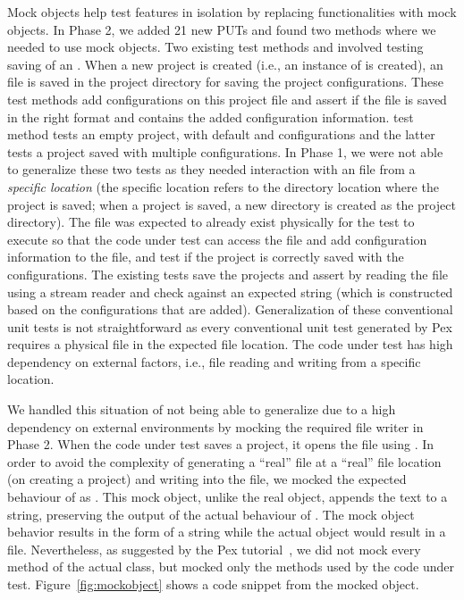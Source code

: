 Mock objects help test features in isolation by replacing functionalities with mock objects. In Phase 2, we added 21 new PUTs and found two methods where we needed to use mock objects. Two existing test methods  and  involved testing saving of an . When a new project is created (i.e., an instance of  is created), an  file is saved in the project directory for saving the project configurations. These test methods add configurations on this project file and assert if the file is saved in the right format and contains the added configuration information.  test method tests an empty project, with default  and  configurations and the latter tests a project saved with multiple configurations. In Phase 1, we were not able to generalize these two tests as they needed interaction with an  file from a \emph{specific location} (the specific location refers to the directory location where the project is saved; when a project is saved, a new directory is created as the project directory). The  file was expected to already exist physically for the test to execute so that the code under test can access the file and add configuration information to the file, and test if the project is correctly saved with the configurations. The existing tests save the projects and assert by reading the  file using a stream reader and check against an expected string (which is constructed based on the configurations that are added). Generalization of these conventional unit tests is not straightforward as every conventional unit test generated by Pex requires a physical file in the expected file location. The code under test has high dependency on external factors, i.e., file reading and writing from a specific location. 

We handled this situation of not being able to generalize due to a high dependency on external environments by mocking the required  file writer in Phase 2. When the code under test saves a project, it opens the  file using . In order to avoid the complexity of generating a ``real'' file at a ``real'' file location (on creating a project) and writing into the file, we mocked the expected behaviour of  as . This mock object, unlike the real object, appends the text to a string, preserving the output of the actual behaviour of . The mock object behavior results in the form of a string while the actual object would result in a file. Nevertheless, as suggested by the Pex tutorial~\cite{PEXDOC}, we did not mock every method of the actual class, but mocked only the methods used by the code under test. Figure~\ref{fig:mockobject} shows a code snippet from the mocked object.

